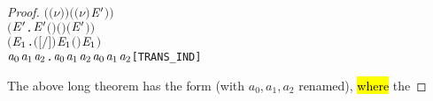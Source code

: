 \begin{proof}
\begin{alltt}
             \ensuremath{(}\ensuremath{(\nu}\ensuremath{)} \ensuremath{)}  \ensuremath{(}\ensuremath{(\nu}\ensuremath{)} \ensuremath{\HOLBoundVar{E}\sp{\prime}}\ensuremath{)}\ensuremath{)} \HOLSymConst{\HOLTokenConj{}}
       \ensuremath{(}\HOLSymConst{\HOLTokenForall{}}  \ensuremath{\HOLBoundVar{E}\sp{\prime}} .    \ensuremath{\HOLBoundVar{E}\sp{\prime}} \HOLSymConst{\HOLTokenImp{}}  \ensuremath{(}  \ensuremath{)} \ensuremath{(}  \ensuremath{)} \ensuremath{(} \ensuremath{\HOLBoundVar{E}\sp{\prime}} \ensuremath{)}\ensuremath{)} \HOLSymConst{\HOLTokenConj{}}
       \ensuremath{(}\HOLSymConst{\HOLTokenForall{}}   \ensuremath{\HOLBoundVar{E}\sb{\mathrm{1}}}.  \ensuremath{(}\ensuremath{[}  \ensuremath{/}\ensuremath{]} \ensuremath{)}  \ensuremath{\HOLBoundVar{E}\sb{\mathrm{1}}} \HOLSymConst{\HOLTokenImp{}}  \ensuremath{(}  \ensuremath{)}  \ensuremath{\HOLBoundVar{E}\sb{\mathrm{1}}}\ensuremath{)} \HOLSymConst{\HOLTokenImp{}}
       \HOLSymConst{\HOLTokenForall{}}\ensuremath{\HOLBoundVar{a}\sb{\mathrm{0}}} \ensuremath{\HOLBoundVar{a}\sb{\mathrm{1}}} \ensuremath{\HOLBoundVar{a}\sb{\mathrm{2}}}. \ensuremath{\HOLBoundVar{a}\sb{\mathrm{0}}} \HOLTokenTransBegin\ensuremath{\HOLBoundVar{a}\sb{\mathrm{1}}}\HOLTokenTransEnd \ensuremath{\HOLBoundVar{a}\sb{\mathrm{2}}} \HOLSymConst{\HOLTokenImp{}}  \ensuremath{\HOLBoundVar{a}\sb{\mathrm{0}}} \ensuremath{\HOLBoundVar{a}\sb{\mathrm{1}}} \ensuremath{\HOLBoundVar{a}\sb{\mathrm{2}}}\hfill{[TRANS_IND]}
\end{alltt}
The above long theorem has the form  (with $a_0, a_1, a_2$ renamed), \hl{where} the

\end{proof}
